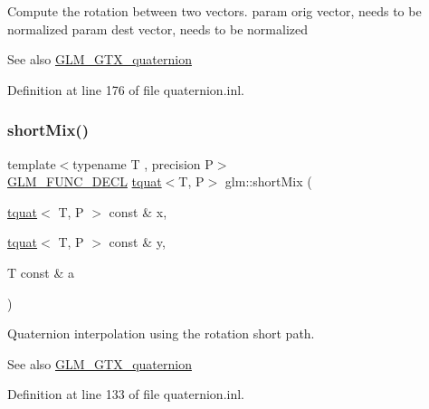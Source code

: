 Compute the rotation between two vectors. param orig vector, needs to be normalized param dest vector, needs to be normalized

\begin{DoxySeeAlso}{See also}
\mbox{\hyperlink{group__gtx__quaternion}{G\+L\+M\+\_\+\+G\+T\+X\+\_\+quaternion}} 
\end{DoxySeeAlso}


Definition at line 176 of file quaternion.\+inl.

\mbox{\label{group__gtx__quaternion_ga3534443de2a1a806f386976546cddc81}} 
\subsubsection{\texorpdfstring{shortMix()}{shortMix()}}
{\footnotesize\ttfamily template$<$typename T , precision P$>$ \\
\mbox{\hyperlink{setup_8hpp_ab2d052de21a70539923e9bcbf6e83a51}{G\+L\+M\+\_\+\+F\+U\+N\+C\+\_\+\+D\+E\+CL}} \mbox{\hyperlink{structglm_1_1tquat}{tquat}}$<$T, P$>$ glm\+::short\+Mix (\begin{DoxyParamCaption}\item[{\mbox{\hyperlink{structglm_1_1tquat}{tquat}}$<$ T, P $>$ const \&}]{x,  }\item[{\mbox{\hyperlink{structglm_1_1tquat}{tquat}}$<$ T, P $>$ const \&}]{y,  }\item[{T const \&}]{a }\end{DoxyParamCaption})}

Quaternion interpolation using the rotation short path.

\begin{DoxySeeAlso}{See also}
\mbox{\hyperlink{group__gtx__quaternion}{G\+L\+M\+\_\+\+G\+T\+X\+\_\+quaternion}} 
\end{DoxySeeAlso}


Definition at line 133 of file quaternion.\+inl.

\mbox{\label{group__gtx__quaternion_gae75f537becdf2b1381b4482ec96e6c82}} 
